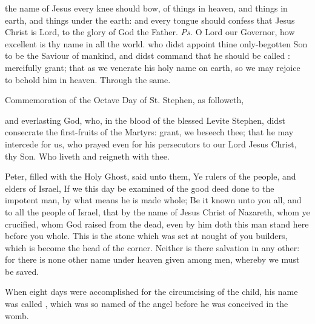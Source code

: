 \introit
{} the name of Jesus every knee should bow, of things in heaven, and things in earth, and things under the earth: and every tongue should confess that Jesus Christ is Lord, to the glory of God the Father. \textit{Ps.} O Lord our Governor, how excellent is thy name in all the world.
\collect
{} who didst appoint thine only-begotten Son to be the Saviour of mankind, and didst command that he should be called : mercifully grant; that as we venerate his holy name on earth, so we may rejoice to behold him in heaven. Through the same.
\begin{rubric}
	Commemoration of the Octave Day of St. Stephen, as followeth,
\end{rubric}
 and everlasting God, who, in the blood of the blessed Levite Stephen, didst consecrate the first-fruits of the Martyrs: grant, we beseech thee; that he may intercede for us, who prayed even for his persecutors to our Lord Jesus Christ, thy Son. Who liveth and reigneth with thee.

 Peter, filled with the Holy Ghost, said unto them, Ye rulers of the people, and elders of Israel, If we this day be examined of the good deed done to the impotent man, by what means he is made whole; Be it known unto you all, and to all the people of Israel, that by the name of Jesus Christ of Nazareth, whom ye crucified, whom God raised from the dead, even by him doth this man stand here before you whole. This is the stone which was set at nought of you builders, which is become the head of the corner. Neither is there salvation in any other: for there is none other name under heaven given among men, whereby we must be saved.


 When eight days were accomplished for the circumcising of the child, his name was called , which was so named of the angel before he was conceived in the womb.

